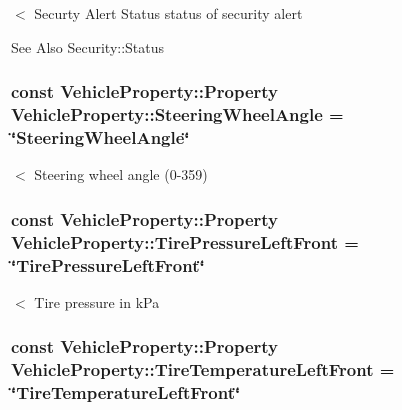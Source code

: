 $<$ Securty Alert Status status of security alert \begin{DoxySeeAlso}{See Also}
Security\-::\-Status 
\end{DoxySeeAlso}
\hypertarget{classVehicleProperty_aba4832663e4f850acbcf09c7cfbc6959}{
\subsubsection[{Steering\-Wheel\-Angle}]{\setlength{\rightskip}{0pt plus 5cm}const Vehicle\-Property\-::\-Property Vehicle\-Property\-::\-Steering\-Wheel\-Angle = \char`\"{}Steering\-Wheel\-Angle\char`\"{}\hspace{0.3cm}{\ttfamily [static]}}}\label{classVehicleProperty_aba4832663e4f850acbcf09c7cfbc6959}
$<$ Steering wheel angle (0-\/359) \hypertarget{classVehicleProperty_ac9231c21753a535525d8526889f7a998}{
\subsubsection[{Tire\-Pressure\-Left\-Front}]{\setlength{\rightskip}{0pt plus 5cm}const Vehicle\-Property\-::\-Property Vehicle\-Property\-::\-Tire\-Pressure\-Left\-Front = \char`\"{}Tire\-Pressure\-Left\-Front\char`\"{}\hspace{0.3cm}{\ttfamily [static]}}}\label{classVehicleProperty_ac9231c21753a535525d8526889f7a998}
$<$ Tire pressure in k\-Pa \hypertarget{classVehicleProperty_aed78bc0c777f0850dee1ee878c8d613a}{
\subsubsection[{Tire\-Temperature\-Left\-Front}]{\setlength{\rightskip}{0pt plus 5cm}const Vehicle\-Property\-::\-Property Vehicle\-Property\-::\-Tire\-Temperature\-Left\-Front = \char`\"{}Tire\-Temperature\-Left\-Front\char`\"{}\hspace{0.3cm}{\ttfamily [static]}}}\label{classVehicleProperty_aed78bc0c777f0850dee1ee878c8d613a}
